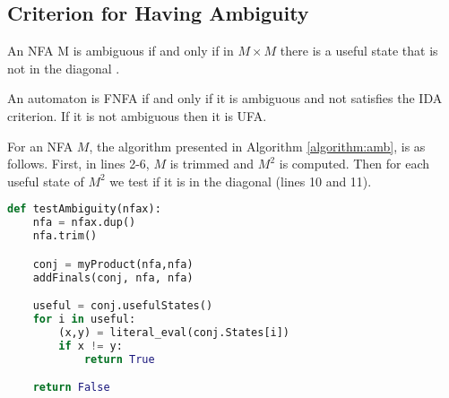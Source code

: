 \subsection{Criterion for Having Ambiguity}
An NFA M is ambiguous if and only if in $M \times M$ there is a useful state that is not in the diagonal \cite{Sakarovitch}.

An automaton is FNFA if and only if it is ambiguous and not satisfies the IDA criterion. If it is not ambiguous then it is UFA.

For an NFA $M$, the algorithm presented in Algorithm \ref{algorithm:amb}, is as follows. First, in lines 2-6, $M$ is trimmed and $M^2$ is computed. Then for each useful state of $M^2$ we test if it is in the diagonal (lines 10 and 11).

\begin{lstlisting}[language=Python, caption = Algorithm to test Ambiguity, label={algorithm:amb}]
def testAmbiguity(nfax):
    nfa = nfax.dup()
    nfa.trim()

    conj = myProduct(nfa,nfa)
    addFinals(conj, nfa, nfa)

    useful = conj.usefulStates()
    for i in useful:
        (x,y) = literal_eval(conj.States[i])
        if x != y:
            return True

    return False
\end{lstlisting}
